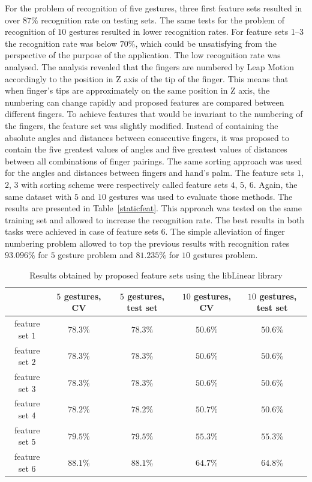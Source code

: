 For the problem of recognition of five gestures, three first feature sets resulted in over $87\%$ recognition rate on testing sets.
The same tests for the problem of recognition of $10$ gestures resulted in lower recognition rates.
For feature sets 1--3 the recognition rate was below $70\%$, which could be unsatisfying from the perspective of the purpose of the application.
The low recognition rate was analysed.  
The analysis revealed that the fingers are numbered by Leap Motion accordingly to the position in Z axis of the tip of the finger.
This means that when finger's tips are approximately on the same position in Z axis, the numbering can change rapidly and proposed features are compared between different fingers.
To achieve features that would be invariant to the numbering of the fingers, the feature set was slightly modified.
Instead of containing the absolute angles and distances between consecutive fingers, it was proposed to contain the five greatest values of angles and five greatest values of distances between all combinations of finger pairings.
The same sorting approach was used for the angles and distances between fingers and hand's palm.
The feature sets $1$, $2$, $3$ with sorting scheme were respectively called feature sets $4$, $5$, $6$.
Again, the same dataset with $5$ and $10$ gestures was used to evaluate those methods. 
The results are presented in Table~\ref{staticfeat}.
This approach was tested on the same training set and allowed to increase the recognition rate.
The best results in both tasks were achieved in case of feature sets $6$.
The simple alleviation of finger numbering problem allowed to top the previous results with recognition rates $93.096\%$ for $5$ gesture problem and $81.235\%$ for $10$ gestures problem. 

\begin{table}[htp!]
\begin{center}
	\label{staticfeatlin}
	\caption{Results obtained by proposed feature sets using the libLinear library}
    \begin{tabular}{ccccc}
    \hline
    ~                                                   & $5$ gestures, CV & $5$ gestures, test set & $10$ gestures, CV  & $10$ gestures, test set \\ \hline
    feature set $1$                     & $78.3\%$ & $78.3\%$  & $50.6\%$ & $50.6\%$ \\ \hline
    feature set $2$                     & $78.3\%$ & $78.3\%$  & $50.6\%$ & $50.6\%$ \\ \hline
    feature set $3$                     & $78.3\%$ & $78.3\%$  & $50.6\%$ & $50.6\%$ \\ \hline
    feature set $4$                     & $78.2\%$ & $78.2\%$  & $50.7\%$ & $50.6\%$ \\ \hline
    feature set $5$                     & $79.5\%$ & $79.5\%$  & $55.3\%$ & $55.3\%$ \\ \hline
    feature set $6$                     & $88.1\%$ & $88.1\%$  & $64.7\%$ & $64.8\%$ \\ \hline
    \end{tabular}
    \end{center}
\end{table}

